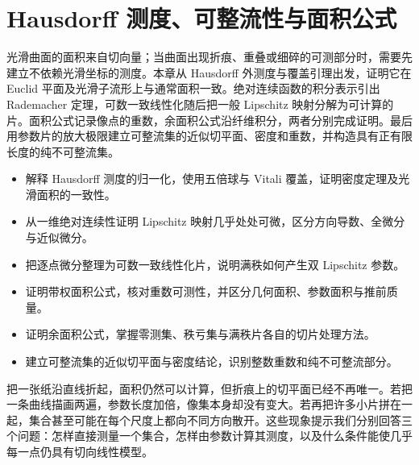 
% 
% 

\chapter{Hausdorff 测度、可整流性与面积公式}
\label{g3:ch:20}

\begin{chapterabstract}
	光滑曲面的面积来自切向量；当曲面出现折痕、重叠或细碎的可测部分时，需要先建立不依赖光滑坐标的测度。本章从 Hausdorff 外测度与覆盖引理出发，证明它在 Euclid 平面及光滑子流形上与通常面积一致。绝对连续函数的积分表示引出 Rademacher 定理，可数一致线性化随后把一般 Lipschitz 映射分解为可计算的片。面积公式记录像点的重数，余面积公式沿纤维积分，两者分别完成证明。最后用参数片的放大极限建立可整流集的近似切平面、密度和重数，并构造具有正有限长度的纯不可整流集。
\end{chapterabstract}

\begin{learninggoals}
	\begin{itemize}
		\item 解释 Hausdorff 测度的归一化，使用五倍球与 Vitali 覆盖，证明密度定理及光滑面积的一致性。
		\item 从一维绝对连续性证明 Lipschitz 映射几乎处处可微，区分方向导数、全微分与近似微分。
		\item 把逐点微分整理为可数一致线性化片，说明满秩如何产生双 Lipschitz 参数。
		\item 证明带权面积公式，核对重数可测性，并区分几何面积、参数面积与推前质量。
		\item 证明余面积公式，掌握零测集、秩亏集与满秩片各自的切片处理方法。
		\item 建立可整流集的近似切平面与密度结论，识别整数重数和纯不可整流部分。
	\end{itemize}
\end{learninggoals}

把一张纸沿直线折起，面积仍然可以计算，但折痕上的切平面已经不再唯一。若把一条曲线描画两遍，参数长度加倍，像集本身却没有变大。若再把许多小片拼在一起，集合甚至可能在每个尺度上都向不同方向散开。这些现象提示我们分别回答三个问题：怎样直接测量一个集合，怎样由参数计算其测度，以及什么条件能使几乎每一点仍具有切向线性模型。

